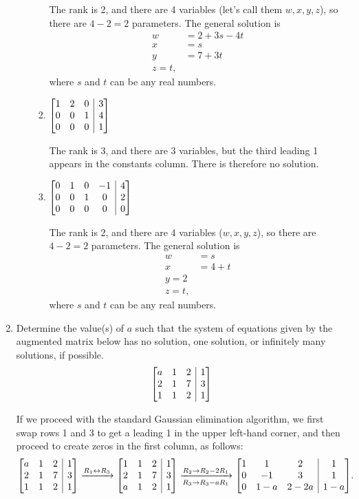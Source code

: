 \documentclass[12pt]{article}
\makeatletter
\newenvironment{amatrix}[1]{%
  \left[\begin{array}{@{}*{#1}{c}|c@{}}
}{%
  \end{array}\right]
}
\newcommand{\di}{\displaystyle}
\newcommand{\bam}{\begin{amatrix}}
\newcommand{\eam}{\end{amatrix}}
\makeatother
\begin{document}
\begin{enumerate}
\begin{enumerate}
\begin{enumerate}
\medskip

The rank is 2, and there are 4 variables (let's call them $w,x,y,z$), so there are $4-2=2$ parameters.
The general solution is
\begin{align*}
 w&=2+3s-4t\\
 x&=s\\
 y&=7+3t\\
 z=t,
\end{align*}
where $s$ and $t$ can be any real numbers.
 \item $\di \bam{3} 1&2&0&3\\0&0&1&4\\0&0&0&1\eam$

\medskip

The rank is 3, and there are 3 variables, but the third leading 1 appears in the constants column. There is therefore no solution.
 \item $\di \bam{4} 0&1&0&-1&4\\0&0&1&0&2\\0&0&0&0&0\eam$

\medskip

The rank is 2, and there are 4 variables ($w,x,y,z$), so there are $4-2=2$ parameters. 
The general solution is
\begin{align*}
 w&=s\\
 x&=4+t\\
 y=2\\
 z=t,
\end{align*}
where $s$ and $t$ can be any real numbers.
\end{enumerate}

 \end{enumerate}



\item Determine the value(s) of $a$ such that the system of equations given by the augmented matrix below has no solution, one solution, or infinitely many solutions, if possible.
\[
\begin{amatrix}{3}
a & 1 & 2 & 1 \\

2 & 1 & 7 & 3 \\

1 & 1 & 2 & 1 \\
\end{amatrix}
\]

\medskip

If we proceed with the standard Gaussian elimination algorithm, we first swap rows 1 and 3 to get a leading 1 in the upper left-hand corner, and then proceed to create zeros in the first column, as follows:
\[
 \bam{3} a& 1&2&1\\2&1&7&3\\1&1&2&1\eam \xrightarrow[]{R_1\leftrightarrow R_3} \bam{3} 1&1&2&1\\2&1&7&3\\a&1&2&1\eam \xrightarrow[R_3\to R_3-aR_1]{R_2\to R_2-2R_1} \bam{3}1&1&2&1\\0&-1&3&1\\0&1-a&2-2a&1-a\eam.
\]


\end{enumerate}
\end{document}
